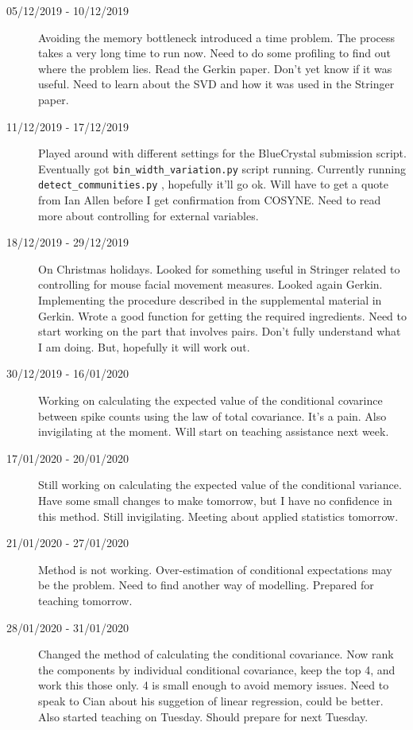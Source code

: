 \documentclass[a4paper,12pt]{article}
\theoremstyle{definition}
\begin{document}
\begin{description}
                                \item[05/12/2019 - 10/12/2019] Avoiding the memory bottleneck introduced a time problem. The process takes a very long time to run now. Need to do some profiling to find out where the problem lies. Read the Gerkin paper. Don't yet know if it was useful. Need to learn about the SVD and how it was used in the Stringer paper.

                                \item[11/12/2019 - 17/12/2019] Played around with different settings for the BlueCrystal submission script. Eventually got \texttt{bin\_width\_variation.py} script running. Currently running \texttt{detect\_communities.py} , hopefully it'll go ok. Will have to get a quote from Ian Allen before I get confirmation from COSYNE. Need to read more about controlling for external variables.

                                \item[18/12/2019 - 29/12/2019] On Christmas holidays. Looked for something useful in Stringer related to controlling for mouse facial movement measures. Looked again Gerkin. Implementing the procedure described in the supplemental material in Gerkin. Wrote a good function for getting the required ingredients. Need to start working on the part that involves pairs. Don't fully understand what I am doing. But, hopefully it will work out.
                                
                                \item[30/12/2019 - 16/01/2020] Working on calculating the expected value of the conditional covarince between spike counts using the law of total covariance. It's a pain. Also invigilating at the moment. Will start on teaching assistance next week.

                                \item[17/01/2020 - 20/01/2020] Still working on calculating the expected value of the conditional variance. Have some small changes to make tomorrow, but I have no confidence in this method. Still invigilating. Meeting about applied statistics tomorrow.

                                \item[21/01/2020 - 27/01/2020] Method is not working. Over-estimation of conditional expectations may be the problem. Need to find another way of modelling. Prepared for teaching tomorrow.

                                \item[28/01/2020 - 31/01/2020] Changed the method of calculating the conditional covariance. Now rank the components by individual conditional covariance, keep the top 4, and work this those only. 4 is small enough to avoid memory issues. Need to speak to Cian about his suggetion of linear regression, could be better. Also started teaching on Tuesday. Should prepare for next Tuesday.


\end{description}
\end{document}
